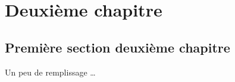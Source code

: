 \chapter{Deuxi\`eme chapitre}
\section{Premi\`ere section deuxi\`eme chapitre}
Un peu de remplissage \newline
\dots
